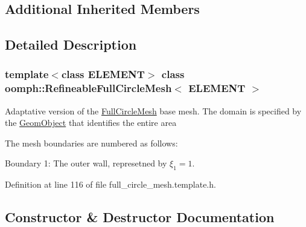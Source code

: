 \subsection*{Additional Inherited Members}


\subsection{Detailed Description}
\subsubsection*{template$<$class E\+L\+E\+M\+E\+NT$>$\newline
class oomph\+::\+Refineable\+Full\+Circle\+Mesh$<$ E\+L\+E\+M\+E\+N\+T $>$}

Adaptative version of the \hyperlink{classoomph_1_1FullCircleMesh}{Full\+Circle\+Mesh} base mesh. The domain is specified by the \hyperlink{classoomph_1_1GeomObject}{Geom\+Object} that identifies the entire area

The mesh boundaries are numbered as follows\+:
\begin{DoxyItemize}
\item Boundary 1\+: The outer wall, represetned by $\xi_1 = 1$.
\end{DoxyItemize}

Definition at line 116 of file full\+\_\+circle\+\_\+mesh.\+template.\+h.



\subsection{Constructor \& Destructor Documentation}
\mbox{\label{classoomph_1_1RefineableFullCircleMesh_a08abf23ee7b1c7cc3082bcf8aa9fc8c9}} 
